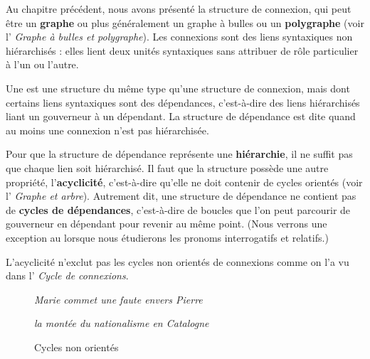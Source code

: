 Au chapitre précédent, nous avons présenté la structure de connexion, qui peut être un \textbf{graphe} ou plus généralement un graphe à bulles ou un \textbf{polygraphe} (voir l’ \textit{Graphe à bulles et polygraphe}). Les connexions sont des liens syntaxiques non hiérarchisés : elles lient deux unités syntaxiques sans attribuer de rôle particulier à l’un ou l’autre.

\begin{styleLivreImportant}
Une  est une structure du même type qu’une structure de connexion, mais dont certains liens syntaxiques sont des dépendances, c’est-à-dire des liens hiérarchisés liant un gouverneur à un dépendant. La structure de dépendance est dite  quand au moins une connexion n’est pas hiérarchisée.
\end{styleLivreImportant}

Pour que la structure de dépendance représente une \textbf{hiérarchie}, il ne suffit pas que chaque lien soit hiérarchisé. Il faut que la structure possède une autre propriété, l’\textbf{acyclicité}, c’est-à-dire qu’elle ne doit contenir de cycles orientés (voir l’ \textit{Graphe et arbre}). Autrement dit, une structure de dépendance ne contient pas de \textbf{cycles de dépendances}, c’est-à-dire de boucles que l’on peut parcourir de gouverneur en dépendant pour revenir au même point. (Nous verrons une exception au  lorsque nous étudierons les pronoms interrogatifs et relatifs.)

L’acyclicité n’exclut pas les cycles non orientés de connexions comme on l’a vu dans l’ \textit{Cycle de connexions}.

\begin{figure}
\begin{minipage}{.5\textwidth}\centering
\textit{Marie commet une faute envers Pierre}\medskip\\
\end{minipage}%
\begin{minipage}{.5\textwidth}\centering
\textit{la montée du nationalisme en Catalogne}\medskip\\
\end{minipage}
\caption{Cycles non orientés\label{fig:}}
\end{figure}

